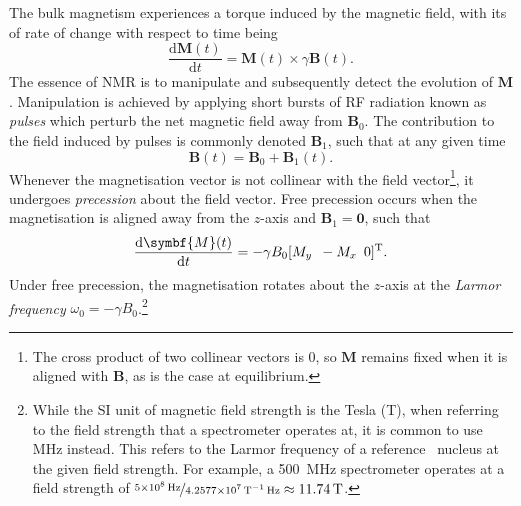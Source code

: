 The bulk magnetism experiences a torque induced by the magnetic field, with its
of rate of change with respect to time being
\begin{equation}
  \frac{\mathrm{d}\symbf{M}(t)}{\mathrm{d}t} = \symbf{M}(t) \times \gamma \symbf{B}(t).
  \label{eq:M-cross-B}
\end{equation}
The essence of \ac{NMR} is to manipulate and subsequently detect the evolution
of $\symbf{M}$. Manipulation is achieved by applying short bursts of \ac{RF}
radiation known as \emph{pulses} which perturb the net magnetic field away from
$\symbf{B}_0$. The contribution to the field induced by pulses is commonly
denoted $\symbf{B}_1$, such that at any given time
\begin{equation}
    \symbf{B}(t) = \symbf{B}_0 + \symbf{B}_1(t).
\end{equation}
Whenever the magnetisation vector is not collinear with the field vector\footnote{
    The cross product of two collinear vectors is $0$, so $\symbf{M}$ remains
    fixed when it is aligned with $\symbf{B}$, as is the case at equilibrium.
}, it
undergoes \emph{precession} about the field vector. Free precession occurs
when the magnetisation is aligned away from the $z$-axis and $\symbf{B}_1 =
\symbf{0}$, such that
\begin{equation}
  \frac{\mathrm{d}\symbf{M}(t)}{\mathrm{d}t} =
  -\gamma B_0 [M_y \hspace*{5pt} -M_x \hspace{5pt} 0]\T.
\end{equation}
Under free precession, the magnetisation rotates about the $z$-axis at the
\emph{Larmor frequency} $\omega_0 = -\gamma B_0$.\footnote{
    While the \ac{SI} unit of magnetic field strength is the Tesla
    (\unit{\tesla}), when referring to the field strength that a spectrometer
    operates at, it is common to use \unit{\mega\hertz} instead. This refers to
    the Larmor frequency of a reference \proton\ nucleus at the
    given field strength. For example, a \qty{500}{\mega\hertz} spectrometer
    operates at a field strength of
    $\nicefrac{\qty{5e8}{\hertz}}{\qty{4.2577e7}{\per\tesla\hertz}}
    \approx \qty{11.74}{\tesla}$.
}

